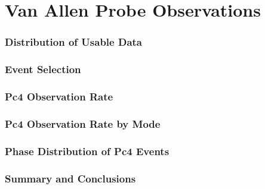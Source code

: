 \documentclass{beamer}
\begin{document}
\section{Van Allen Probe Observations}


\begin{frame}
\frametitle{Distribution of Usable Data}
\end{frame}


\begin{frame}
\frametitle{Event Selection}
\end{frame}


\begin{frame}
\frametitle{Pc4 Observation Rate}
\end{frame}


\begin{frame}
\frametitle{Pc4 Observation Rate by Mode}
\end{frame}


\begin{frame}
\frametitle{Phase Distribution of Pc4 Events}
\end{frame}


\begin{frame}
\frametitle{Summary and Conclusions}
\end{frame}

 
\end{document}
